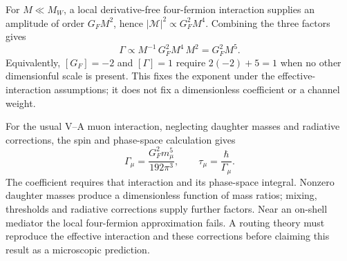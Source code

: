For $M\ll M_W$, a local derivative-free four-fermion interaction supplies an amplitude of order $G_FM^2$, hence $|\mathcal M|^2\propto G_F^2M^4$. Combining the three factors gives
\begin{equation}
\Gamma\propto M^{-1}\,G_F^2M^4\,M^2=G_F^2M^5.
\end{equation}
Equivalently, $[G_F]=-2$ and $[\Gamma]=1$ require $2(-2)+5=1$ when no other dimensionful scale is present. This fixes the exponent under the effective-interaction assumptions; it does not fix a dimensionless coefficient or a channel weight.

For the usual V--A muon interaction, neglecting daughter masses and radiative corrections, the spin and phase-space calculation gives\cite{navas_review_2024}
\begin{equation}
\Gamma_\mu=\frac{G_F^2m_\mu^5}{192\pi^3},\qquad
\tau_\mu=\frac{\hbar}{\Gamma_\mu}.
\end{equation}
The coefficient requires that interaction and its phase-space integral. Nonzero daughter masses produce a dimensionless function of mass ratios; mixing, thresholds and radiative corrections supply further factors. Near an on-shell mediator the local four-fermion approximation fails. A routing theory must reproduce the effective interaction and these corrections before claiming this result as a microscopic prediction.

